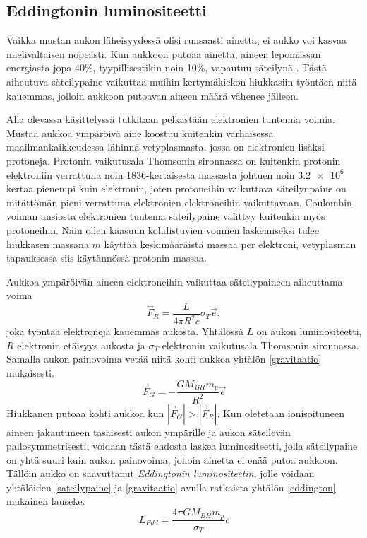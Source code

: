 \documentclass[12pt,a4paper]{article}
\begin{document}
\subsection{Eddingtonin luminositeetti}
Vaikka mustan aukon läheisyydessä olisi runsaasti ainetta, ei aukko voi kasvaa mielivaltaisen nopeasti. Kun aukkoon putoaa ainetta, aineen lepomassan energiasta jopa 40\%, tyypillisestikin noin 10\%, vapautuu säteilynä \cite{pringle}. Tästä aiheutuva säteilypaine vaikuttaa muihin kertymäkiekon hiukkasiin työntäen niitä kauemmas, jolloin aukkoon putoavan aineen määrä vähenee jälleen. \cite{bartelmann}

Alla olevassa käsittelyssä tutkitaan pelkästään elektronien tuntemia voimia. Mustaa aukkoa ympäröivä aine koostuu kuitenkin varhaisessa maailmankaikkeudessa lähinnä vetyplasmasta, jossa on elektronien lisäksi protoneja. Protonin vaikutusala Thomsonin sironnassa on kuitenkin protonin elektroniin verrattuna noin 1836-kertaisesta massasta johtuen noin $\SI{3,2e6}{}$ kertaa pienempi kuin elektronin, joten protoneihin vaikuttava säteilynpaine on mitättömän pieni verrattuna elektronien elektroneihin vaikuttavaan. Coulombin voiman ansiosta elektronien tuntema säteilypaine välittyy kuitenkin myös protoneihin. Näin ollen kaasuun kohdistuvien voimien laskemiseksi tulee hiukkasen massana $m$ käyttää keskimääräistä massaa per elektroni, vetyplasman tapauksessa siis käytännössä protonin massaa. \cite{pringle}

Aukkoa ympäröivän aineen elektroneihin vaikuttaa säteilypaineen aiheuttama voima
\begin{equation}\label{sateilypaine}
	\vec{F}_R = \frac{L}{4 \pi R^2 c} \sigma_T \vec{e},
\end{equation}
joka työntää elektroneja kauemmas aukosta. Yhtälössä $L$ on aukon luminositeetti, $R$ elektronin etäisyys aukosta ja $\sigma_T$ elektronin vaikutusala Thomsonin sironnassa. Samalla aukon painovoima vetää niitä kohti aukkoa yhtälön \ref{gravitaatio} mukaisesti.
\begin{equation}\label{gravitaatio}
	\vec{F}_G = -\frac{GM_{BH}m_p}{R^2}\vec{e}
\end{equation}
Hiukkanen putoaa kohti aukkoa kun $|\vec{F}_G|>|\vec{F}_R|$. Kun oletetaan ionisoituneen aineen jakautuneen tasaisesti aukon ympärille ja aukon säteilevän pallosymmetrisesti, voidaan tästä ehdosta laskea luminositeetti, jolla säteilypaine on yhtä suuri kuin aukon painovoima, jolloin ainetta ei enää putoa aukkoon. Tällöin aukko on saavuttanut \textit{Eddingtonin luminositeetin}, jolle voidaan yhtälöiden \ref{sateilypaine} ja \ref{gravitaatio} avulla ratkaista yhtälön \ref{eddington} mukainen lauseke. \cite{pringle}
\begin{equation}\label{eddington}
	L_{Edd}=\frac{4 \pi GM_{BH}m_{p}}{\sigma_T}c
\end{equation}
\end{document}
